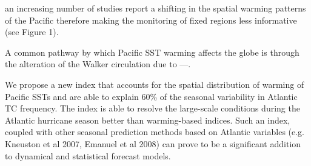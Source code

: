 an increasing number of studies report a shifting in the spatial warming patterns of the Pacific therefore making the monitoring of fixed regions less informative (see Figure 1). 


A common pathway by which Pacific SST warming affects the globe is through the alteration of the Walker circulation due to ---. 



We propose a new index that accounts for the spatial distribution of warming of Pacific SSTs and are able to explain 60\% of the seasonal variability in Atlantic TC frequency. The index is able to resolve the large-scale conditions during the Atlantic hurricane season better than warming-based indices. Such an index, coupled with other seasonal prediction methods based on Atlantic variables (e.g. Kneuston et al 2007, Emanuel et al 2008) can prove to be a significant addition to dynamical and statistical forecast models.


